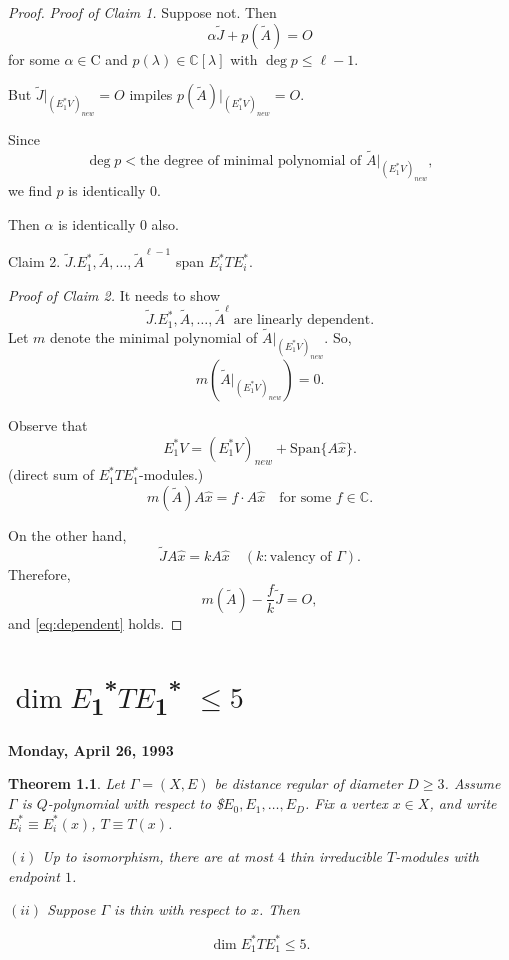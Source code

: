 \documentclass[
]{book}
\newtheorem{theorem}{Theorem}[chapter]
\theoremstyle{definition}
\theoremstyle{definition}
\theoremstyle{definition}
\theoremstyle{definition}
\theoremstyle{remark}
\begin{document}
\begin{proof}
\emph{Proof of Claim 1.}
Suppose not. Then
\[\alpha \tilde{J} + p(\tilde{A}) = O\]
for some \(\alpha\in \mathrm{C}\) and \(p(\lambda)\in \mathbb{C}[\lambda]\) with \(\deg p \leq \ell -1\).

But \(\tilde{J}|_{(E^*_1V)_{new}} = O\) impiles \(p(\tilde{A})|_{(E^*_1V)_{new}}=O\).

Since
\[\deg p < \text{the degree of minimal polynomial of $\tilde{A}|_{(E^*_1V)_{new}}$},\]
we find \(p\) is identically \(0\).

Then \(\alpha\) is identically \(0\) also.

Claim 2. \(\tilde{J}. E^*_1, \tilde{A}, \ldots, \tilde{A}^{\ell-1}\) span \(E^*_iTE^*_i\).

\emph{Proof of Claim 2.}
It needs to show
\begin{equation}
\tilde{J}. E^*_1, \tilde{A}, \ldots, \tilde{A}^{\ell} \; \text{are linearly dependent}.\label{eq:dependent}
\end{equation}
Let \(m\) denote the minimal polynomial of \(\tilde{A}|_{(E^*_1V)_{new}}\). So,
\[m(\tilde{A}|_{(E^*_1V)_{new}}) = 0.\]

Observe that
\[E^*_1V = (E^*_1V)_{new} + \mathrm{Span}\{A\hat{x}\}.\]
(direct sum of \(E^*_1TE^*_1\)-modules.)
\[m(\tilde{A})A\hat{x} = f\cdot A\hat{x}\quad \text{for some }f\in \mathbb{C}.\]

On the other hand,
\[\tilde{J}A\hat{x} = kA\hat{x} \quad (k: \text{valency of }\Gamma).\]
Therefore,
\[m(\tilde{A}) - \frac{f}{k}\tilde{J} = O,\]
and \eqref{eq:dependent} holds.

\end{proof}

\hypertarget{lec35}{%
\chapter{\texorpdfstring{\(\dim E\)\textsubscript{1}\textsuperscript{*}\(TE\)\textsubscript{1}\textsuperscript{*} \(\leq 5\)}{\textbackslash dim E1*TE1* \textbackslash leq 5}}\label{lec35}}

\textbf{Monday, April 26, 1993}

\begin{theorem}
\protect\hypertarget{thm:dim5}{}\label{thm:dim5}Let \(\Gamma = (X, E)\) be distance regular of diameter \(D\geq 3\).
Assume \(\Gamma\) is \(Q\)-polynomial with respect to
\$\(E_0, E_1, \ldots, E_D\).
Fix a vertex \(x\in X\), and write \(E^*_i\equiv E^*_i(x)\), \(T\equiv T(x)\).

\((i)\) Up to isomorphism, there are at most \(4\) thin irreducible \(T\)-modules with endpoint \(1\).

\((ii)\) Suppose \(\Gamma\) is thin with respect to \(x\). Then

\[\dim E^*_1TE^*_1 \leq 5.\]
\end{theorem}
\end{document}
